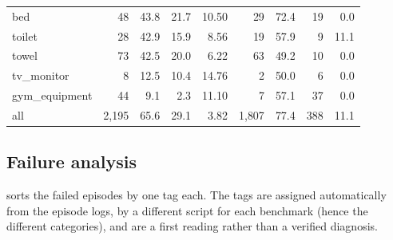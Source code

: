 \documentclass[10pt]{article}
\newcommand{\oldrev}{\textsuperscript{$\ast$}}
\begin{document}
\begin{table}[t]
\begin{tabular}{@{}lrrrr@{\hspace{14pt}}rrrr@{}}
bed                & 48  & 43.8 & 21.7 & 10.50 & 29  & 72.4 & 19 & 0.0 \\
toilet             & 28  & 42.9 & 15.9 & 8.56  & 19  & 57.9 & 9  & 11.1 \\
towel              & 73  & 42.5 & 20.0 & 6.22  & 63  & 49.2 & 10 & 0.0 \\
tv\_monitor        & 8   & 12.5 & 10.4 & 14.76 & 2   & 50.0 & 6  & 0.0 \\
gym\_equipment     & 44  & 9.1  & 2.3  & 11.10 & 7   & 57.1 & 37 & 0.0 \\
\midrule
all                & 2{,}195 & 65.6\rlap{\oldrev} & 29.1\rlap{\oldrev} & 3.82 & 1{,}807 & 77.4\rlap{\oldrev} & 388 & 11.1 \\
\bottomrule
\end{tabular}
\end{table}

\subsection{Failure analysis}\label{sec:results-failures}
 sorts the failed episodes by one tag each. The tags are
assigned automatically from the episode logs, by a different script for each
benchmark (hence the different categories), and are a first reading rather
than a verified diagnosis.
\end{document}
